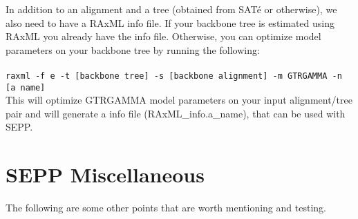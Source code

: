 \documentclass[11pt]{article} %
\newcommand{\sepp}{SEPP\xspace}
\newcommand{\ins}[1]{{\tt #1}}
\newcommand{\file}[1]{{\sf #1}}
\newcommand{\sate}{SAT\'{e}\xspace}
\begin{document}
In addition to an alignment and a tree (obtained from \sate or otherwise),
we also need to have a RAxML info file. If your backbone tree is estimated using
RAxML you already have the info file. Otherwise, you can optimize model parameters
on your backbone tree by running the following:\\\\
\ins{raxml -f e -t [backbone tree] -s [backbone alignment] -m GTRGAMMA -n [a name]}\\

This will optimize GTRGAMMA model parameters on your input alignment/tree pair and will
generate a info file (\file{RAxML\_info.a\_name}), that can be used with \sepp. 

\section{\sepp Miscellaneous }
The following are some other points that are worth mentioning and testing.
\end{document}
